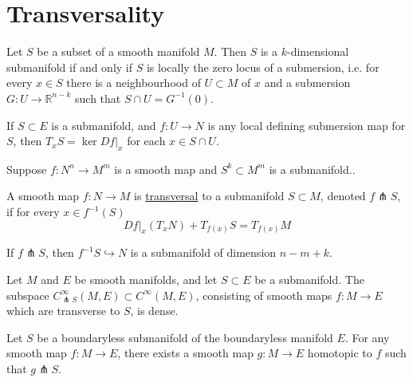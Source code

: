 \chapter{Transversality} 
\label{appendix4}

\begin{thm}
	Let $S$ be a subset of a smooth manifold $M$. Then $S$ is a  $k$-dimensional
	submanifold if and only if  $S$ is locally the zero locus of a submersion,
	i.e. for every  $x\in S$ there is a neighbourhood of $U\subset M$ of $x$ and
	a submersion  $G : U \to \mathbb{R}^{n-k}$ such that $S\cap U = G^{-1}(0)$.
\end{thm}

\begin{thm}
	If $S \subset E$ is a submanifold, and $f: U \to N$ is any local defining
	submersion map for $S$, then $T_xS = \ker Df|_x$ for each $x\in S\cap U$.
\end{thm}
\noindent
Suppose $f : N^n \to M^m$ is a smooth map and  $S^k \subset M^m$ is a submanifold..
\begin{defn}
	A smooth map $f: N\to M$ is \underline{transversal} to a submanifold
	$S\subset M$, denoted $f \pitchfork S$, if for every $x\in f^{-1}(S)$ 
	\[
	Df|_x(T_xN) + T_{f(x)}S = T_{f(x)}M
	\] 
\end{defn}

\begin{thm} \label{thm:inverse_submanifold}
	 If $f \pitchfork S$, then  $f^{-1}S \hookrightarrow N$ is a 
	submanifold of dimension $n-m+k$.
\end{thm}

\begin{thm}
	Let $M$ and $E$ be smooth manifolds, and let  $S\subset E$ be a submanifold. 
	The subspace $C^{\infty}_{\pitchfork S}(M,E) \subset C^{\infty}(M,E)$,
	consisting of smooth maps $f:M\to E$ which are transverse to  $S$, is dense.
\end{thm}
\begin{comment}
	This is equivalent to the following. For any smooth map $f: M\to E$ there
	exists a smooth embedding  $s:S\to E$ arbitrarily close to  $i:S\to E$, and
	for which  $f$ is transverse to  $s$. 
\end{comment}

\begin{thm}
	Let $S$ be a boundaryless submanifold of the boundaryless manifold  $E$. 
	For any smooth map $f: M\to E$, there exists a smooth map $g: M\to E$
	homotopic to  $f$ such that  $g \pitchfork S$.
\end{thm}
